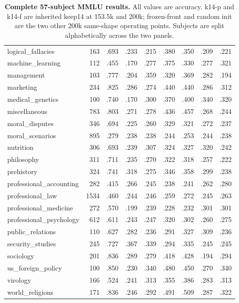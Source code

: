 \begin{table}[t]
\begin{minipage}[t]{.495\textwidth}
{\begin{tabular}{@{}lrrrrrrrr@{}}
logical\_fallacies & 163 & .693 & .233 & .215 & .380 & .350 & .209 & .221 \\
machine\_learning & 112 & .455 & .170 & .277 & .375 & .330 & .277 & .321 \\
management & 103 & .777 & .204 & .359 & .320 & .369 & .282 & .194 \\
marketing & 234 & .825 & .286 & .274 & .440 & .440 & .286 & .312 \\
medical\_genetics & 100 & .740 & .170 & .300 & .370 & .400 & .340 & .320 \\
miscellaneous & 783 & .803 & .271 & .278 & .436 & .457 & .268 & .244 \\
moral\_disputes & 346 & .694 & .225 & .260 & .329 & .321 & .272 & .237 \\
moral\_scenarios & 895 & .279 & .238 & .238 & .244 & .253 & .244 & .238 \\
nutrition & 306 & .693 & .239 & .307 & .324 & .327 & .320 & .242 \\
philosophy & 311 & .711 & .235 & .270 & .322 & .318 & .257 & .222 \\
prehistory & 324 & .741 & .318 & .275 & .346 & .358 & .299 & .238 \\
professional\_accounting & 282 & .415 & .266 & .245 & .238 & .241 & .262 & .280 \\
professional\_law & 1534 & .460 & .244 & .246 & .259 & .272 & .245 & .263 \\
professional\_medicine & 272 & .570 & .199 & .239 & .228 & .232 & .301 & .301 \\
professional\_psychology & 612 & .611 & .243 & .247 & .320 & .302 & .260 & .275 \\
public\_relations & 110 & .627 & .282 & .236 & .291 & .327 & .309 & .236 \\
security\_studies & 245 & .727 & .367 & .339 & .294 & .335 & .245 & .245 \\
sociology & 201 & .836 & .289 & .279 & .418 & .428 & .194 & .294 \\
us\_foreign\_policy & 100 & .850 & .230 & .340 & .480 & .450 & .270 & .340 \\
virology & 166 & .524 & .241 & .313 & .355 & .386 & .283 & .313 \\
world\_religions & 171 & .836 & .246 & .292 & .491 & .509 & .287 & .322 \\
\bottomrule
\end{tabular}%
}
\end{minipage}
\caption{\textbf{Complete 57-subject MMLU results.} All values are accuracy. k14-p and k14-f are inherited keep14 at 153.5k and 200k; frozen-front and random init are the two other 200k same-shape operating points. Subjects are split alphabetically across the two panels.}
\label{tab:app-mmlu-full}
\end{table}
